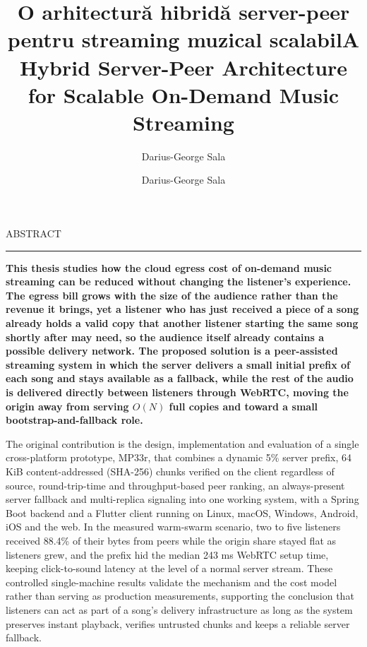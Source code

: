 \documentclass[12pt]{report}
\begin{document}
\makeatletter
{}
\makeatother

\title{O arhitectură hibridă server-peer pentru streaming muzical scalabil}
\author{Darius-George Sala}
\maketitle

\makeatletter
{}
\makeatother

\title{A Hybrid Server-Peer Architecture for Scalable On-Demand Music Streaming}
\author{Darius-George Sala}
\maketitle

\newpage
{}

\cleardoublepage
ABSTRACT
\vspace{0.5cm}
\hrule
\vspace{0.5cm}
{\bfseries
This thesis studies how the cloud egress cost of on-demand music streaming can be reduced without changing the listener's experience. The egress bill grows with the size of the audience rather than the revenue it brings, yet a listener who has just received a piece of a song already holds a valid copy that another listener starting the same song shortly after may need, so the audience itself already contains a possible delivery network. The proposed solution is a peer-assisted streaming system in which the server delivers a small initial prefix of each song and stays available as a fallback, while the rest of the audio is delivered directly between listeners through WebRTC, moving the origin away from serving $O(N)$ full copies and toward a small bootstrap-and-fallback role.

\par The original contribution is the design, implementation and evaluation of a single cross-platform prototype, MP33r, that combines a dynamic 5\% server prefix, 64 KiB content-addressed (SHA-256) chunks verified on the client regardless of source, round-trip-time and throughput-based peer ranking, an always-present server fallback and multi-replica signaling into one working system, with a Spring Boot backend and a Flutter client running on Linux, macOS, Windows, Android, iOS and the web. In the measured warm-swarm scenario, two to five listeners received 88.4\% of their bytes from peers while the origin share stayed flat as listeners grew, and the prefix hid the median 243 ms WebRTC setup time, keeping click-to-sound latency at the level of a normal server stream. These controlled single-machine results validate the mechanism and the cost model rather than serving as production measurements, supporting the conclusion that listeners can act as part of a song's delivery infrastructure as long as the system preserves instant playback, verifies untrusted chunks and keeps a reliable server fallback.
}
\end{document}
